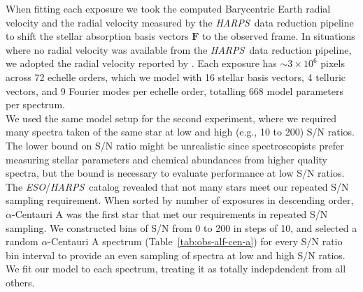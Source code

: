 \documentclass[modern]{aastex631}
\newcommand{\project}[1]{\textit{#1}}
\renewcommand{\vec}[1]{\mathbf{#1}}
\newcommand{\eso}{\project{ESO}}
\newcommand{\harps}{\project{HARPS}}
\newcommand{\todo}[1]{\textcolor{tab:red}{#1}}
\begin{document}
When fitting each exposure we took the computed Barycentric Earth radial velocity and the radial velocity measured by the \harps\ data reduction pipeline to shift the stellar absorption basis vectors $\vec{F}$ to the observed frame. In situations where no radial velocity was available from the \harps\ data reduction pipeline, we adopted the radial velocity reported by \citep{Someone}. Each exposure has $\sim3\times10^6$ pixels across 72 echelle orders, which we model with 16 stellar basis vectors, 4 telluric vectors, and \todo{9} Fourier modes per echelle order, totalling \todo{668} model parameters per spectrum.\\

We used the same model setup for the second experiment, where we required many spectra taken of the same star at low and high (e.g., 10 to 200) S/N ratios. The lower bound on S/N ratio might be unrealistic since spectroscopists prefer measuring stellar parameters and chemical abundances from higher quality spectra, but the bound is necessary to evaluate performance at low S/N ratios. The \eso/\harps\ catalog revealed that not many stars meet our repeated S/N sampling requirement. When sorted by number of exposures in descending order, $\alpha$-Centauri A was the first star that met our requirements in repeated S/N sampling. We constructed bins of S/N from 0 to 200 in steps of 10, and selected a random $\alpha$-Centauri A spectrum (Table~\ref{tab:obs-alf-cen-a}) for every S/N ratio bin interval to provide an even sampling of spectra at low and high S/N ratios. We fit our model to each spectrum, treating it as totally indepdendent from all others.\\
\end{document}
